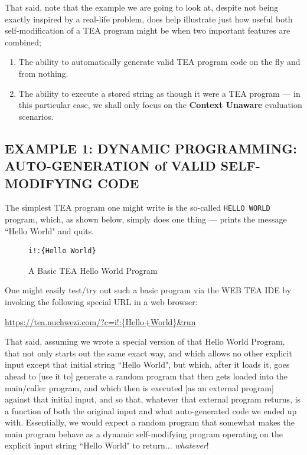 \documentclass[a4paper, 18pt]{book} %
\begin{document}
That said, note that the example we are going to look at, despite not being exactly inspired by a real-life problem, does help illustrate just how useful both self-modification of a TEA program might be when two important features are combined; 

\begin{enumerate}
\item The ability to automatically generate valid TEA program code on the fly and from nothing.
\item The ability to execute a stored string as though it were a TEA program --- in this particular case, we shall only focus on the \textbf{Context Unaware} evaluation scenarios.
\end{enumerate}


\subsection{EXAMPLE 1: \textbf{DYNAMIC PROGRAMMING:} AUTO-GENERATION of VALID SELF-MODIFYING CODE}
\label{SECEXAMP1E}


The simplest TEA program one might write is the so-called \texttt{HELLO WORLD} program, which, as shown below, simply does one thing --- prints the message ``Hello World" and quits.


\begin{figure}[H]
 \Large
  \begin{tcolorbox}[teaterminalstyle, title=A Basic TEA Hello World Program]
  \begin{lstlisting}[language=TEA]
i!:{Hello World}
   \end{lstlisting}
  \end{tcolorbox}
  \caption{A Basic TEA Hello World Program}
  \label{EXTEAHW}
\end{figure}


One might easily test/try out such a basic program via the WEB TEA IDE by invoking the following special URL in a web browser:

\vspace{1em}

 \url{https://tea.nuchwezi.com/?c=i!:{Hello+World}&run}

\vspace{1em}
That said, assuming we wrote a special version of that Hello World Program, that not only starts out the same exact way, and which allows no other explicit input except that initial string ``Hello World", but which, after it loads it, goes ahead to [use it to] generate a random program that then gets loaded into the main/caller program, and which then is executed [as an external program] against that initial input, and so that, whatever that external program returns, is a function of both the original input and what auto-generated code we ended up with. Essentially, we would expect a random program that somewhat makes the main program behave as a dynamic self-modifying program operating on the explicit input string ``Hello World" to return... \textit{whatever}!
\end{document}
